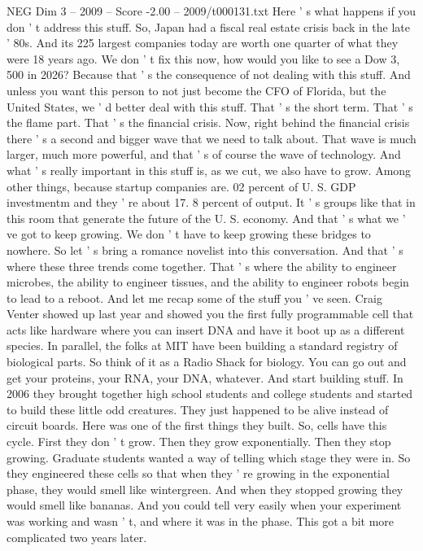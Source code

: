 \begin{textsample}{NEG Dim 3 – 2009 – Score -2.00 – 2009/t000131.txt}
Here ' s what happens if you don ' t address this stuff.
So, Japan had a fiscal real estate crisis back in the late ' 80s.
And its 225 largest companies today are worth one quarter of what they were 18 years ago.
We don ' t fix this now, how would you like to see a Dow 3, 500 in 2026?
Because that ' s the consequence of not dealing with this stuff.
And unless you want this person to not just become the CFO of Florida, but the United States, we ' d better deal with this stuff.
That ' s the short term.
That ' s the flame part.
That ' s the financial crisis.
Now, right behind the financial crisis there ' s a second and bigger wave that we need to talk about.
That wave is much larger, much more powerful, and that ' s of course the wave of technology.
And what ' s really important in this stuff is, as we cut, we also have to grow.
Among other things, because startup companies are. 02 percent of U.
S.
GDP investmentm and they ' re about 17. 8 percent of output.
It ' s groups like that in this room that generate the future of the U.
S. economy.
And that ' s what we ' ve got to keep growing.
We don ' t have to keep growing these bridges to nowhere.
So let ' s bring a romance novelist into this conversation.
And that ' s where these three trends come together.
That ' s where the ability to engineer microbes, the ability to engineer tissues, and the ability to engineer robots begin to lead to a reboot.
And let me recap some of the stuff you ' ve seen.
Craig Venter showed up last year and showed you the first fully programmable cell that acts like hardware where you can insert DNA and have it boot up as a different species.
In parallel, the folks at MIT have been building a standard registry of biological parts.
So think of it as a Radio Shack for biology.
You can go out and get your proteins, your RNA, your DNA, whatever.
And start building stuff.
In 2006 they brought together high school students and college students and started to build these little odd creatures.
They just happened to be alive instead of circuit boards.
Here was one of the first things they built.
So, cells have this cycle.
First they don ' t grow.
Then they grow exponentially.
Then they stop growing.
Graduate students wanted a way of telling which stage they were in.
So they engineered these cells so that when they ' re growing in the exponential phase, they would smell like wintergreen.
And when they stopped growing they would smell like bananas.
And you could tell very easily when your experiment was working and wasn ' t, and where it was in the phase.
This got a bit more complicated two years later.

\end{textsample}
